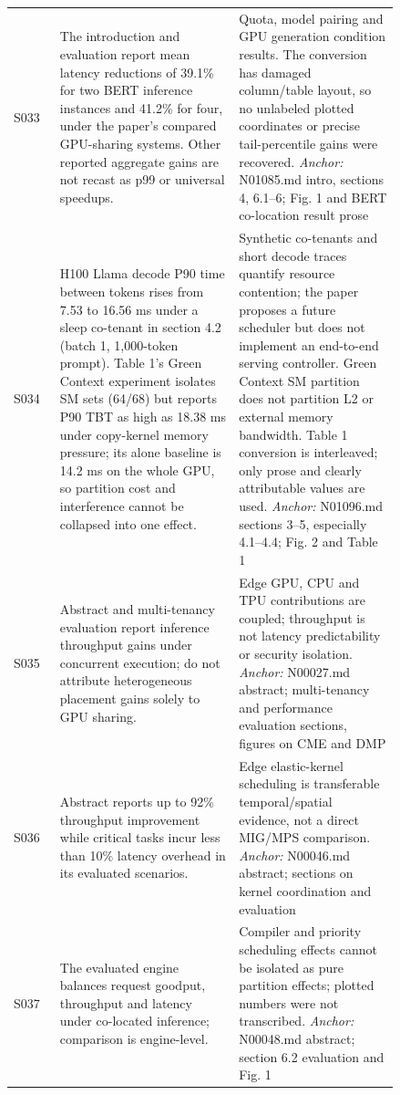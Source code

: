 \begin{longtable}{P{0.105\linewidth}P{0.39\linewidth}P{0.35\linewidth}}
S033 \cite{bless} & The introduction and evaluation report mean latency reductions of 39.1\% for two BERT inference instances and 41.2\% for four, under the paper's compared GPU-sharing systems. Other reported aggregate gains are not recast as p99 or universal speedups. & Quota, model pairing and GPU generation condition results. The conversion has damaged column/table layout, so no unlabeled plotted coordinates or precise tail-percentile gains were recovered. \emph{Anchor:} N01085.md intro, sections 4, 6.1--6; Fig. 1 and BERT co-location result prose \\
S034 \cite{interference_deeper} & H100 Llama decode P90 time between tokens rises from 7.53 to 16.56 ms under a sleep co-tenant in section 4.2 (batch 1, 1,000-token prompt). Table 1's Green Context experiment isolates SM sets (64/68) but reports P90 TBT as high as 18.38 ms under copy-kernel memory pressure; its alone baseline is 14.2 ms on the whole GPU, so partition cost and interference cannot be collapsed into one effect. & Synthetic co-tenants and short decode traces quantify resource contention; the paper proposes a future scheduler but does not implement an end-to-end serving controller. Green Context SM partition does not partition L2 or external memory bandwidth. Table 1 conversion is interleaved; only prose and clearly attributable values are used. \emph{Anchor:} N01096.md sections 3--5, especially 4.1--4.4; Fig. 2 and Table 1 \\
S035 \cite{edge_sky} & Abstract and multi-tenancy evaluation report inference throughput gains under concurrent execution; do not attribute heterogeneous placement gains solely to GPU sharing. & Edge GPU, CPU and TPU contributions are coupled; throughput is not latency predictability or security isolation. \emph{Anchor:} N00027.md abstract; multi-tenancy and performance evaluation sections, figures on CME and DMP \\
S036 \cite{miriam} & Abstract reports up to 92\% throughput improvement while critical tasks incur less than 10\% latency overhead in its evaluated scenarios. & Edge elastic-kernel scheduling is transferable temporal/spatial evidence, not a direct MIG/MPS comparison. \emph{Anchor:} N00046.md abstract; sections on kernel coordination and evaluation \\
S037 \cite{elasticroom} & The evaluated engine balances request goodput, throughput and latency under co-located inference; comparison is engine-level. & Compiler and priority scheduling effects cannot be isolated as pure partition effects; plotted numbers were not transcribed. \emph{Anchor:} N00048.md abstract; section 6.2 evaluation and Fig. 1 \\

\end{longtable}
